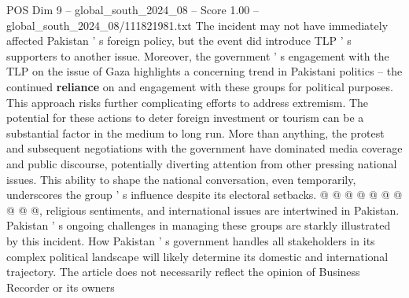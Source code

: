 \begin{textsample}{POS Dim 9 – global\_south\_2024\_08 – Score 1.00 – global\_south\_2024\_08/111821981.txt}
The incident may not have immediately affected Pakistan ' s foreign policy, but the event did introduce TLP ' s supporters to another issue.
Moreover, the government ' s engagement with the TLP on the issue of Gaza highlights a concerning trend in Pakistani politics -- the continued \textbf{reliance} on and engagement with these groups for political purposes.
This approach risks further complicating efforts to address extremism.
The potential for these actions to deter foreign investment or tourism can be a substantial factor in the medium to long run.
More than anything, the protest and subsequent negotiations with the government have dominated media coverage and public discourse, potentially diverting attention from other pressing national issues.
This ability to shape the national conversation, even temporarily, underscores the group ' s influence despite its electoral setbacks. @ @ @ @ @ @ @ @ @ @, religious sentiments, and international issues are intertwined in Pakistan.
Pakistan ' s ongoing challenges in managing these groups are starkly illustrated by this incident.
How Pakistan ' s government handles all stakeholders in its complex political landscape will likely determine its domestic and international trajectory.
The article does not necessarily reflect the opinion of Business Recorder or its owners

\end{textsample}
